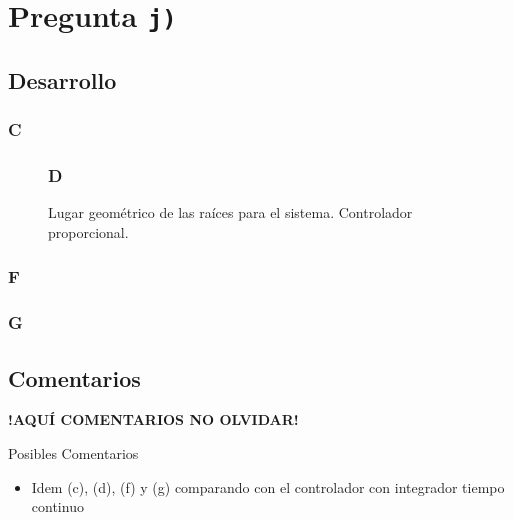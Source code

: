 \section{Pregunta \texttt{j)}}\label{pregunta-j}
\subsection{Desarrollo}

\subsubsection{C} %

\begin{figure}[ht]


\FloatBarrier
\subsubsection{D}%

\centering

\caption{Lugar geométrico de las raíces para el sistema. Controlador proporcional.}
\label{fig:lgr-j}
\end{figure}

\FloatBarrier
\subsubsection{F}%

\FloatBarrier
\subsubsection{G}%


\FloatBarrier
\subsection{Comentarios}


\textbf{!AQUÍ COMENTARIOS NO OLVIDAR!}

Posibles Comentarios
\begin{itemize}
    \item Idem (c), (d), (f) y (g) comparando con el controlador con integrador tiempo continuo
\end{itemize}
